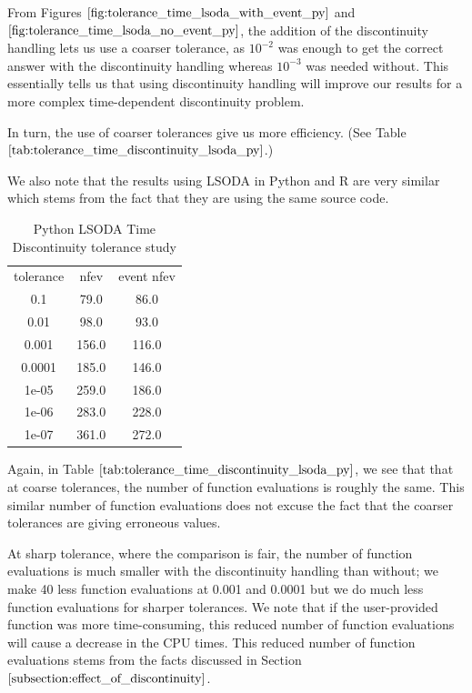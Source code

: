 From Figures $\ref{fig:tolerance_time_lsoda_with_event_py}$ and $\ref{fig:tolerance_time_lsoda_no_event_py}$, the addition of the discontinuity handling lets us use a coarser tolerance, as $10^{-2}$ was enough to get the correct answer with the discontinuity handling whereas $10^{-3}$ was needed without. This essentially tells us that using discontinuity handling will improve our results for a more complex time-dependent discontinuity problem.

In turn, the use of coarser tolerances give us more efficiency. (See Table $\ref{tab:tolerance_time_discontinuity_lsoda_py}$.)

We also note that the results using LSODA in Python and R are very similar which stems from the fact that they are using the same source code.

\begin{table}[h]
\caption {Python LSODA Time Discontinuity tolerance study} \label{tab:tolerance_time_discontinuity_lsoda_py} 
\begin{center}
\begin{tabular}{ c c c }
tolerance & nfev  & event nfev \\ 
0.1    & 79.0  & 86.0  \\
0.01   & 98.0  & 93.0  \\
0.001  & 156.0 & 116.0 \\
0.0001 & 185.0 & 146.0 \\
1e-05  & 259.0 & 186.0 \\
1e-06  & 283.0 & 228.0 \\
1e-07  & 361.0 & 272.0 \\
\end{tabular}
\end{center}
\end{table}
Again, in Table $\ref{tab:tolerance_time_discontinuity_lsoda_py}$, we see that that at coarse tolerances, the number of function evaluations is roughly the same. This similar number of function evaluations does not excuse the fact that the coarser tolerances are giving erroneous values. 

At sharp tolerance, where the comparison is fair, the number of function evaluations is much smaller with the discontinuity handling than without; we make 40 less function evaluations at 0.001 and 0.0001 but we do much less function evaluations for sharper tolerances. We note that if the user-provided function was more time-consuming, this reduced number of function evaluations will cause a decrease in the CPU times. This reduced number of function evaluations stems from the facts discussed in Section $\ref{subsection:effect_of_discontinuity}$. 

